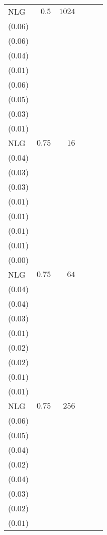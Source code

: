 \begin{table}[t]
\begin{tabular}{lrrrrr}
NLG & \(0.5\) & \(1024\) & \longcell{\(0.53\)\\{\tiny(\(0.06\))}} & \longcell{\(0.48\)\\{\tiny(\(0.06\))}} & \longcell{\(0.36\)\\{\tiny(\(0.04\))}} & \longcell{\(0.15\)\\{\tiny(\(0.01\))}} & \longcell{\(0.30\)\\{\tiny(\(0.06\))}} & \longcell{\(0.26\)\\{\tiny(\(0.05\))}} & \longcell{\(0.18\)\\{\tiny(\(0.03\))}} & \longcell{\(0.07\)\\{\tiny(\(0.01\))}} \\[2.2e\\[2.2ex]
NLG & \(0.75\) & \(16\) & \longcell{\(0.11\)\\{\tiny(\(0.04\))}} & \longcell{\(0.11\)\\{\tiny(\(0.03\))}} & \longcell{\(0.09\)\\{\tiny(\(0.03\))}} & \longcell{\(0.05\)\\{\tiny(\(0.01\))}} & \longcell{\(0.04\)\\{\tiny(\(0.01\))}} & \longcell{\(0.03\)\\{\tiny(\(0.01\))}} & \longcell{\(0.03\)\\{\tiny(\(0.01\))}} & \longcell{\(0.01\)\\{\tiny(\(0.00\))}} \\[2.2e\\[2.2ex]
NLG & \(0.75\) & \(64\) & \longcell{\(0.25\)\\{\tiny(\(0.04\))}} & \longcell{\(0.22\)\\{\tiny(\(0.04\))}} & \longcell{\(0.17\)\\{\tiny(\(0.03\))}} & \longcell{\(0.08\)\\{\tiny(\(0.01\))}} & \longcell{\(0.09\)\\{\tiny(\(0.02\))}} & \longcell{\(0.08\)\\{\tiny(\(0.02\))}} & \longcell{\(0.06\)\\{\tiny(\(0.01\))}} & \longcell{\(0.03\)\\{\tiny(\(0.01\))}} \\[2.2e\\[2.2ex]
NLG & \(0.75\) & \(256\) & \longcell{\(0.37\)\\{\tiny(\(0.06\))}} & \longcell{\(0.33\)\\{\tiny(\(0.05\))}} & \longcell{\(0.26\)\\{\tiny(\(0.04\))}} & \longcell{\(0.12\)\\{\tiny(\(0.02\))}} & \longcell{\(0.17\)\\{\tiny(\(0.04\))}} & \longcell{\(0.15\)\\{\tiny(\(0.03\))}} & \longcell{\(0.11\)\\{\tiny(\(0.02\))}} & \longcell{\(0.05\)\\{\tiny(\(0.01\))}} \\[2.2e\\[2.2ex]

\end{tabular}
\end{table}
